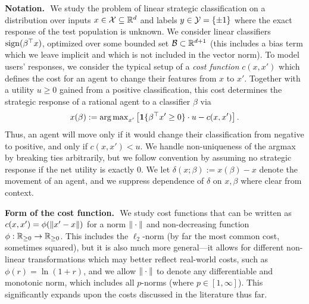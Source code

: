 \documentclass{article}
\newcommand{\posutil}{u}
\newcommand{\costfunc}{c}
\theoremstyle{definition}
\renewcommand{\paragraph}[1]{{\textbf{#1}\,\,}}
\begin{document}
\paragraph{Notation.}
We study the problem of linear strategic classification on a distribution over inputs $x \in {\mathcal{X}}\subseteq\mathbb{R}^d$ and labels $y\in{\mathcal{Y}}=\{\pm 1\}$ where the exact response of the test population is unknown.
We consider linear classifiers $\operatorname{sign}(\beta^\top x)$,
optimized over some bounded set ${\mathcal{B}}\subset \mathbb{R}^{d+1}$
(this includes a bias term which we leave implicit and which is not included in the vector norm).
To model users' responses, we consider the typical setup of a \emph{cost function} $\costfunc(x, x')$ which defines the cost for an agent to change their features from $x$ to $x'$. Together with a utility $\posutil \geq 0$ gained from a positive classification, this cost determines the strategic response of a rational agent to a classifier $\beta$ via
\begin{align}
    \label{eq:best_response}
    x(\beta) := \operatorname*{arg\,max}\nolimits_{x'} \left[ \mathbf{1}\{\beta^\top x' \geq 0\} \cdot u - c(x,x') \right].
\end{align}
Thus, an agent will move only if it would change their classification from negative to positive, and only if $c(x, x') < \posutil$. We handle non-uniqueness of the argmax by breaking ties arbitrarily, but we follow convention by assuming no strategic response if the net utility is exactly 0. We let $\delta(x; \beta) := x(\beta) - x$ denote the movement of an agent, and we suppress dependence of $\delta$ on $x, \beta$ where clear from context.

\paragraph{Form of the cost function.} We study cost functions that can be written as $\costfunc(x, x') = \phi(\norm{x' - x})$ for a norm $\| \cdot \|$ and non-decreasing function $\phi:\mathbb{R}_{\geq 0}\to\mathbb{R}_{\geq 0}$.
This includes the $\ell_2$-norm (by far the most common cost, sometimes squared), but it is also much more general---it allows for different non-linear transformations which may better reflect real-world costs, such as $\phi(r) = \ln (1+r)$, and we allow $\| \cdot \|$ to denote any differentiable and monotonic norm, which includes all $p$-norms (where $p\in[1,\infty]$).
This significantly expands upon the costs discussed in the literature thus far.
\end{document}
